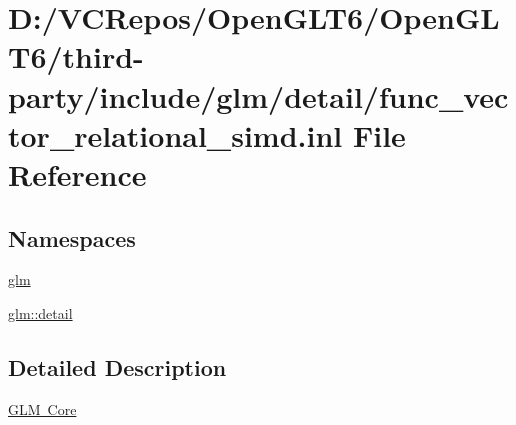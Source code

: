 \hypertarget{func__vector__relational__simd_8inl}{}\section{D\+:/\+V\+C\+Repos/\+Open\+G\+L\+T6/\+Open\+G\+L\+T6/third-\/party/include/glm/detail/func\+\_\+vector\+\_\+relational\+\_\+simd.inl File Reference}
\label{func__vector__relational__simd_8inl}
\subsection*{Namespaces}
\begin{DoxyCompactItemize}
\item 
 \mbox{\hyperlink{namespaceglm}{glm}}
\item 
 \mbox{\hyperlink{namespaceglm_1_1detail}{glm\+::detail}}
\end{DoxyCompactItemize}


\subsection{Detailed Description}
\mbox{\hyperlink{group__core}{G\+LM Core}} 